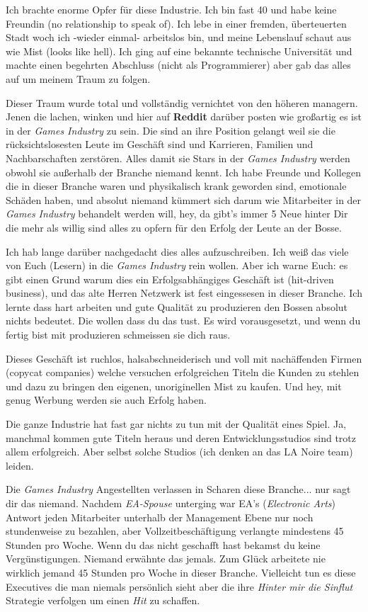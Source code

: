 \documentclass[10pt,a4paper,ngerman,twoside]{article} %
\begin{document}
\begin{multicols}{3}
Ich brachte enorme Opfer für diese Industrie. Ich bin fast 40 und habe keine Freundin  (no relationship to speak of). Ich lebe in einer fremden, überteuerten Stadt woch ich -wieder einmal- arbeitslos bin, und meine Lebenslauf schaut aus wie Mist (looks like hell). Ich ging auf eine bekannte technische Universität und machte einen begehrten Abschluss (nicht als Programmierer) aber gab das alles auf um meinem Traum zu folgen. 

Dieser Traum wurde total und vollständig vernichtet von den höheren managern. Jenen die lachen, winken und hier auf \textbf{Reddit} darüber posten wie großartig es ist in der \textit{Games Industry} zu sein. Die sind an ihre Position gelangt weil sie die rücksichtslosesten Leute im Geschäft sind und Karrieren, Familien und Nachbarschaften zerstören. Alles damit sie Stars in der \textit{Games Industry} werden obwohl sie außerhalb der Branche niemand kennt. Ich habe Freunde und Kollegen die in dieser Branche waren und physikalisch krank geworden sind, emotionale Schäden haben, und absolut niemand kümmert sich darum wie Mitarbeiter in der \textit{Games Industry} behandelt werden will, hey, da gibt's immer 5 Neue hinter Dir die mehr als willig sind alles zu opfern für den Erfolg der Leute an der Bosse.

Ich hab lange darüber nachgedacht dies alles aufzuschreiben. Ich weiß das viele von Euch (Lesern) in die \textit{Games Industry} rein wollen. Aber ich warne Euch: es gibt einen Grund warum dies ein Erfolgsabhängiges Geschäft ist (hit-driven business), und das alte Herren Netzwerk ist fest eingessesen in dieser Branche. Ich lernte dass hart arbeiten und gute Qualität zu produzieren den Bossen absolut nichts bedeutet. Die wollen dass du das tust. Es wird vorausgesetzt, und wenn du fertig bist mit produzieren schmeissen sie dich raus.

Dieses Geschäft ist ruchlos, halsabschneiderisch und voll mit nachäffenden Firmen (copycat companies) welche versuchen erfolgreichen Titeln die Kunden zu stehlen und  dazu zu bringen den eigenen, unoriginellen Mist zu kaufen. Und hey, mit genug Werbung werden sie auch Erfolg haben.

Die ganze Industrie hat fast gar nichts zu tun mit der Qualität eines Spiel. Ja, manchmal kommen gute Titeln heraus und deren Entwicklungsstudios sind trotz allem erfolgreich. Aber selbst solche Studios (ich denken an das LA Noire team) leiden.

Die \textit{Games Industry} Angestellten verlassen in Scharen diese Branche... nur sagt dir das niemand. Nachdem\textit{ EA-Spouse} unterging war EA's (\textit{Electronic Arts}) Antwort jeden Mitarbeiter unterhalb der Management Ebene nur noch stundenweise zu bezahlen, aber Vollzeitbeschäftigung verlangte mindestens 45 Stunden pro Woche. Wenn du das nicht geschafft hast bekamst du keine Vergünstigungen. Niemand erwähnte das jemals. Zum Glück arbeitete nie wirklich jemand 45 Stunden pro Woche in dieser Branche. Vielleicht tun es diese Executives die man niemals persönlich sieht aber die ihre \textit{Hinter mir die Sinflut} Strategie verfolgen um einen \textit{Hit} zu schaffen. 


\end{multicols}
\end{document}
